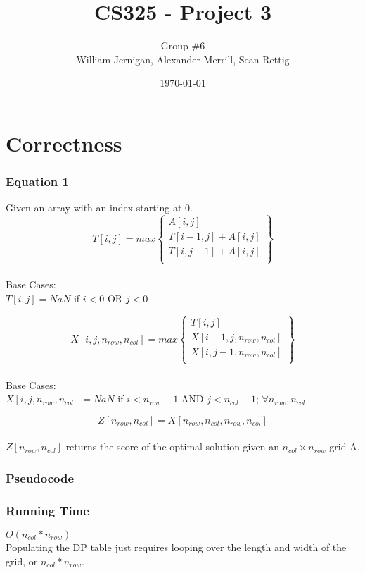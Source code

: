 \documentclass{article}
\title{CS325 - Project 3}
\author{Group \#6 \\ William Jernigan, Alexander Merrill, Sean Rettig}
\date{\today}
\begin{document}
\maketitle

\part*{Correctness}
\section*{Equation 1}
Given an array with an index starting at 0.\\

\[ T[i,j] = max \left\{ \begin{array}{ll}
    A[i,j]\\
    T[i-1,j] + A[i,j]\\
    T[i,j-1] + A[i,j]\\\end{array} \right\} \] \\
Base Cases:\\
$T[i,j] = NaN$ if $i < 0$ OR $j < 0$

\[ X[i,j,n_{row},n_{col}] = max \left\{ \begin{array}{ll}
    T[i,j]\\
    X[i-1,j,n_{row},n_{col}]\\
    X[i,j-1,n_{row},n_{col}]\\\end{array} \right\} \] \\
Base Cases:\\
$X[i,j,n_{row},n_{col}] = NaN$ if $i < n_{row}-1$ AND $j < n_{col}-1$; $\forall n_{row},n_{col}$

\[ Z[n_{row},n_{col}] = X[n_{row},n_{col},n_{row},n_{col}] \] \\
$Z[n_{row},n_{col}]$ returns the score of the optimal solution given an $n_{col} \times n_{row}$ grid A.
\pagebreak


\section*{Pseudocode}


\section*{Running Time}
$\Theta(n_{col} * n_{row})$\\
Populating the DP table just requires looping over the length and width of the grid, or $n_{col} * n_{row}$.
\end{document}
